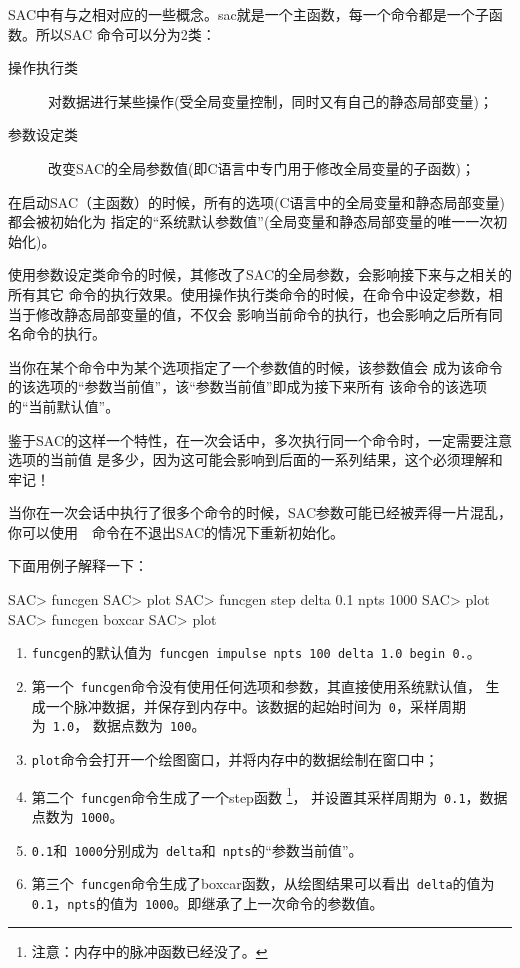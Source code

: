 SAC中有与之相对应的一些概念。sac就是一个主函数，每一个命令都是一个子函数。所以SAC
命令可以分为2类：
\begin{description}
\item[操作执行类] 对数据进行某些操作(受全局变量控制，同时又有自己的静态局部变量)；
\item[参数设定类] 改变SAC的全局参数值(即C语言中专门用于修改全局变量的子函数)；
\end{description}

在启动SAC（主函数）的时候，所有的选项(C语言中的全局变量和静态局部变量)都会被初始化为
指定的``系统默认参数值''(全局变量和静态局部变量的唯一一次初始化)。

使用参数设定类命令的时候，其修改了SAC的全局参数，会影响接下来与之相关的所有其它
命令的执行效果。使用操作执行类命令的时候，在命令中设定参数，相当于修改静态局部变量的值，不仅会
影响当前命令的执行，也会影响之后所有同名命令的执行。

当你在某个命令中为某个选项指定了一个参数值的时候，该参数值会
成为该命令的该选项的``参数当前值''，该``参数当前值''即成为接下来所有
该命令的该选项的``当前默认值''。

鉴于SAC的这样一个特性，在一次会话中，多次执行同一个命令时，一定需要注意选项的当前值
是多少，因为这可能会影响到后面的一系列结果，这个必须理解和牢记！

\begin{Tips}
当你在一次会话中执行了很多个命令的时候，SAC参数可能已经被弄得一片混乱，
你可以使用~~命令在不退出SAC的情况下重新初始化。
\end{Tips}

下面用例子解释一下：
\begin{SACCode}
SAC> funcgen
SAC> plot
SAC> funcgen step delta 0.1 npts 1000
SAC> plot
SAC> funcgen boxcar
SAC> plot
\end{SACCode}

\begin{enumerate}
\item \verb+funcgen+的默认值为~\verb+funcgen impulse npts 100 delta 1.0 begin 0.+。
\item 第一个~\verb+funcgen+命令没有使用任何选项和参数，其直接使用系统默认值，
    生成一个脉冲数据，并保存到内存中。该数据的起始时间为~\verb+0+，采样周期为~\verb+1.0+，
    数据点数为~\verb+100+。
\item \verb+plot+命令会打开一个绘图窗口，并将内存中的数据绘制在窗口中；
\item 第二个~\verb+funcgen+命令生成了一个step函数
    \footnote{注意：内存中的脉冲函数已经没了。}，
    并设置其采样周期为~\verb+0.1+，数据点数为~\verb+1000+。
\item \verb+0.1+和~\verb+1000+分别成为~\verb+delta+和~\verb+npts+的``参数当前值''。
\item 第三个~\verb+funcgen+命令生成了boxcar函数，从绘图结果可以看出~\verb+delta+的值为
    \verb+0.1+，\verb+npts+的值为~\verb+1000+。即继承了上一次命令的参数值。
\end{enumerate}
